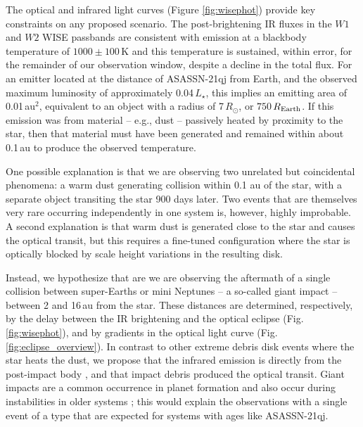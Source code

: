 \documentclass[sn-nature]{sn-jnl}%
\newcommand{\asas}{ASASSN-21qj}
\begin{document}

The optical and infrared light curves (Figure \ref{fig:wisephot}) provide key constraints on any proposed scenario.
%
The post-brightening IR fluxes in the $W1$ and $W2$ WISE passbands are consistent with emission at a blackbody temperature of $1000 \pm 100$\,K and this temperature is sustained, within error, for the remainder of our observation window, despite a decline in the total flux.
%
For an emitter located at the distance of ASASSN-21qj from Earth, and the observed  maximum luminosity of approximately 0.04\,$L_\star$, this implies an emitting area of 0.01\,au$^2$, equivalent to an object with a radius of 7\,$R_\odot$, or $750$\,$R_{\rm Earth}$.
%
If this emission was from material -- e.g., dust -- passively heated by proximity to the star, then that material must have been generated and remained within about 0.1\,au to produce the observed temperature.


One possible explanation is that we are observing two unrelated but coincidental phenomena: a warm dust generating collision within 0.1 au of the star, with a separate object transiting the star 900 days later.
%
Two events that are themselves very rare occurring independently in one system is, however, highly improbable.
%
A second explanation is that warm dust is generated close to the star and causes the optical transit, but this requires a fine-tuned configuration where the star is optically blocked by scale height variations in the resulting disk.

Instead, we hypothesize that are we are observing the aftermath of a single collision between super-Earths or mini Neptunes -- a so-called giant impact -- between 2 and 16\,au from the star. 
%
These distances are determined, respectively, by the delay between the IR brightening and the optical eclipse (Fig. \ref{fig:wisephot}), and by gradients in the optical light curve (Fig. \ref{fig:eclipse_overview}).
%
In contrast to other extreme debris disk events where the star heats the dust, we propose that the infrared emission is directly from the post-impact body \cite{Lock2017,2009ApJ...704..770M}, and that impact debris produced the optical transit.
%
Giant impacts are a common occurrence in planet formation \cite{Schlichting2018a,DAngelo2018} and also occur during instabilities in older systems \cite{Kaib2016}; this would explain the observations with a single event of a type that are expected for systems with ages like \asas{}.
\end{document}
